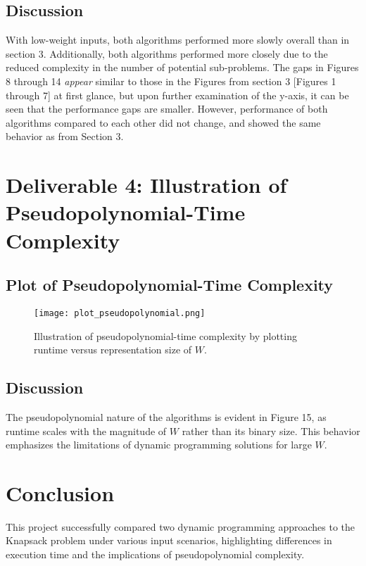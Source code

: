 \documentclass{article}
\begin{document}
\subsection{Discussion}
With low-weight inputs, both algorithms performed more slowly overall than in section 3. Additionally, both algorithms performed more closely due to the reduced complexity in the number of potential sub-problems. The gaps in Figures 8 through 14 \textit{appear} similar to those in the Figures from section 3 [Figures 1 through 7] at first glance, but upon further examination of the y-axis, it can be seen that the performance gaps are smaller. However, performance of both algorithms compared to each other did not change, and showed the same behavior as from Section 3.  

\newpage
\section{Deliverable 4: Illustration of Pseudopolynomial-Time Complexity}
\subsection{Plot of Pseudopolynomial-Time Complexity}
\begin{figure}[h!]
    \centering
    \texttt{[image: plot\_pseudopolynomial.png]}
    \caption{Illustration of pseudopolynomial-time complexity by plotting runtime versus representation size of \( W \).}
\end{figure}

\subsection{Discussion}
The pseudopolynomial nature of the algorithms is evident in Figure 15, as runtime scales with the magnitude of \( W \) rather than its binary size. This behavior emphasizes the limitations of dynamic programming solutions for large \( W \).

\section*{Conclusion}
This project successfully compared two dynamic programming approaches to the Knapsack problem under various input scenarios, highlighting differences in execution time and the implications of pseudopolynomial complexity.
\end{document}
